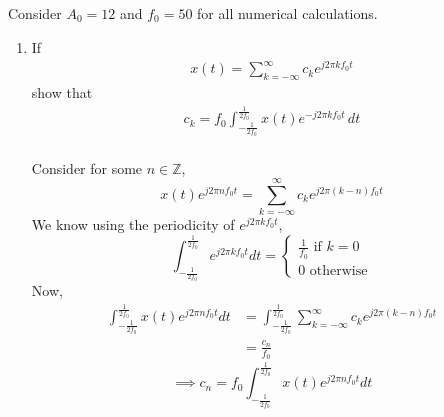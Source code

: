 \documentclass[journal,12pt,twocolumn]{IEEEtran}
\renewcommand\thesection{\arabic{section}}
\begin{document}
Consider $A_0 =12$ and $f_0 = 50$ for all numerical calculations.

\begin{enumerate}[label=\thesection.\arabic*,ref=\thesection.\theenumi]

\item If
	\begin{align}
		x(t) = \sum_{k = -\infty}^{\infty}c_k e^{j2\pi kf_0 t}
	\label{eq:one-Z-complex}
	\end{align}
	show that
	\begin{align}
		c_k = f_0\int_{-\frac{1}{2f_0}}^{\frac{1}{2f_0}}x(t)e^{-j2\pi kf_0 t}\, dt
	\label{eq:one-Z}
	\end{align}
	\solution\\
	Consider for some \( n \in \mathbb{Z} \),
	\[ x(t) e^{j2\pi nf_0 t} = \sum_{k=-\infty}^\infty c_k e^{j2\pi (k-n) f_0 t} \]
	We know using the periodicity of \( e^{j2\pi kf_0 t} \),
	\[
		\int_{-\frac{1}{2f_0}}^{\frac{1}{2f_0}} e^{j2\pi kf_0 t} dt =
		\begin{cases}
			\frac{1}{f_0} \text{ if } k=0 \\
			0 \text{ otherwise}
		\end{cases}
	\]
	Now,
	\begin{align*}
		\int_{-\frac{1}{2f_0}}^{\frac{1}{2f_0}}x(t) e^{j2\pi nf_0 t} dt
		&= \int_{-\frac{1}{2f_0}}^{\frac{1}{2f_0}}
		\sum_{k=-\infty}^\infty c_k e^{j2\pi (k-n) f_0 t} \\
		&= \frac{c_n}{f_0}
	\end{align*}
	\[
		\implies c_n = f_0 \int_{-\frac{1}{2f_0}}^{\frac{1}{2f_0}}x(t) e^{j2\pi nf_0 t} dt
	\]
	
	\pagebreak


\end{enumerate}
\end{document}

